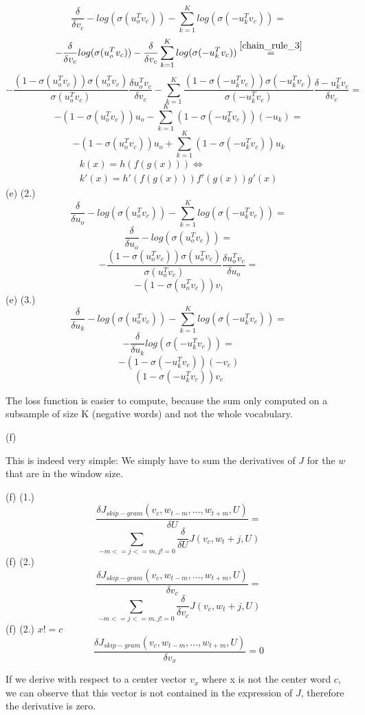 \documentclass{article}
\begin{document}
$$\frac{\delta}{\delta v_c} - log(\sigma(u_o^T v_c)) - \sum_{k=1}^K log(\sigma(-u_k^Tv_c)) = $$
$$- \frac{\delta}{\delta v_c} log(\sigma(u_o^T v_c)) -  \frac{\delta}{\delta v_c}\sum_{k=1}^K log(\sigma(-u_k^Tv_c)) \overset{\mathrm{\ref{chain_rule_3}}}{=}$$
$$-\frac{(1 - \sigma(u_o^T v_c))\sigma(u_o^T v_c)}{\sigma(u_o^T v_c)}\frac{\delta u_o^T v_c}{\delta v_c} - \sum_{k=1}^{K}\frac{(1 - \sigma(-u_k^T v_c))\sigma(-u_k^T v_c)}{\sigma(-u_k^T v_c)}\frac{\delta -u_k^T v_c}{\delta v_c} = $$
$$-(1 - \sigma(u_o^T v_c))u_o - \sum_{k=1}^{K}(1 - \sigma(-u_k^T v_c))(-u_k) = $$
$$-(1 - \sigma(u_o^T v_c))u_o + \sum_{k=1}^{K}(1 - \sigma(-u_k^T v_c))u_k$$
\begin{equation}\label{chain_rule_3}
    \begin{aligned}
    k(x) = h(f(g(x))) \iff \\
    k'(x) = h'(f(g(x))) f'(g(x))g'(x)
    \end{aligned}
\end{equation}
(e) (2.)
$$\frac{\delta}{\delta u_o} - log(\sigma(u_o^T v_c)) - \sum_{k=1}^K log(\sigma(-u_k^Tv_c)) = $$
$$\frac{\delta}{\delta u_o} - log(\sigma(u_o^T v_c)) = $$
$$ - \frac{(1-\sigma(u_o^T v_c))\sigma(u_o^T v_c)}{\sigma(u_o^T v_c)}\frac{\delta u_o^T v_c}{\delta u_o} = $$
$$ - (1-\sigma(u_o^T v_c))v_)$$
(e) (3.)
$$\frac{\delta}{\delta u_k} - log(\sigma(u_o^T v_c)) - \sum_{k=1}^K log(\sigma(-u_k^Tv_c)) = $$
$$- \frac{\delta}{\delta u_k} log(\sigma(-u_k^Tv_c)) = $$
$$ - (1-\sigma(-u_k^Tv_c))(-v_c)$$
$$ (1-\sigma(-u_k^Tv_c))v_c$$


The loss function is easier to compute, because the sum only computed on a subsample of size K (negative words) and not the whole vocabulary.

(f) \newline

This is indeed very simple: We simply have to sum the derivatives of $J$ for the $w$ that are in the window size.

(f) (1.)
$$\frac{\delta J_{skip-gram}(v_c, w_{t-m},...,w_{t+m}, U)}{\delta U} = $$
$$\sum_{-m <= j <= m, j!= 0}\frac{\delta}{\delta U}J(v_c, w_t + j, U)$$
(f) (2.)
$$\frac{\delta J_{skip-gram}(v_c, w_{t-m},...,w_{t+m}, U)}{\delta v_c} = $$
$$\sum_{-m <= j <= m, j!= 0}\frac{\delta}{\delta v_c}J(v_c, w_t + j, U)$$
(f) (2.)
$x != c$
$$\frac{\delta J_{skip-gram}(v_c, w_{t-m},...,w_{t+m}, U)}{\delta v_x} = 0$$

If we derive with respect to a center vector $v_x$ where x is not the center word $c$, we can observe that this vector is not contained in the expression of $J$, therefore the derivative is zero.
\end{document}
